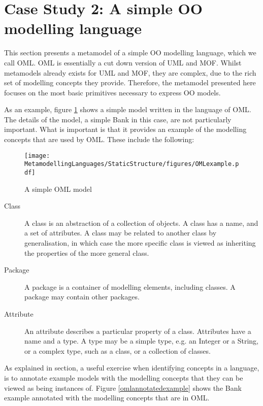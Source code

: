\section{Case Study 2: A simple OO modelling language}

This section presents a metamodel of a simple OO modelling language, which we call OML. OML is essentially a cut down version of UML and MOF. Whilst metamodels already exists for UML and MOF, they are complex, due to the rich set of modelling concepts they provide. Therefore, the metamodel presented here focuses on the most basic primitives necessary to express OO models.

As an example, figure \ref{omlexample} shows a simple model written in the language of OML.
The details of the model, a simple Bank in this case, are not particularly important. What is important is that it provides an example of the modelling concepts that are used by OML. These include the following:

\begin{figure}[htb]
\begin{center}
\texttt{[image: MetamodellingLanguages/StaticStructure/figures/OMLexample.pdf]}
\caption{A simple OML model}
\label{omlexample}
\end{center}
\end{figure}

\begin{description}
\item [Class] A class is an abstraction of a collection of objects. A class has a name, and a set of attributes. A class may be related to another class by generalisation, in which case the more specific class is viewed as inheriting the properties of the more general class.
\item [Package] A package is a container of modelling elements, including classes. A package may contain other packages.
\item [Attribute] An attribute describes a particular property of a class. Attributes have a name and a type. A type may be a simple type, e.g. an Integer or a String, or a complex type, such as a class, or a collection of classes.
\end{description}

As explained in section, a useful exercise when identifying concepts in a language, is to annotate example models with the modelling concepts that they can be viewed as being instances of. Figure \ref{omlannotatedexample} shows the Bank example annotated with the modelling concepts that are in OML.

